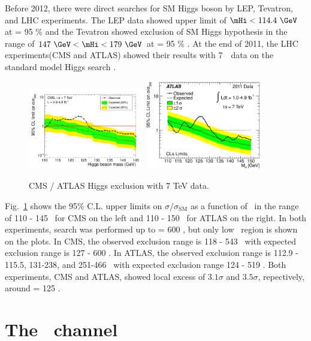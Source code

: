 Before 2012, there were direct searches for SM Higgs boson by LEP, Tevatron, 
and LHC experiments. 
The LEP data showed upper limit of $\mHi<114.4~\GeV$ at \CLs = 95 \% \cite{Beringer:1900zz} 
and the Tevatron showed exclusion of SM Higgs hypothesis in the range of 
$147~\GeV < \mHi < 179~\GeV$ at \CLs = 95 \% \cite{Beringer:1900zz}. 
At the end of 2011, the LHC experiments(CMS and ATLAS) showed their results with 7~\TeV\ data
on the standard model Higgs search \cite{Chatrchyan201226,Aad201249}. 
\begin{figure}[htp]
\centering
\includegraphics[width=0.45\textwidth]{figures/cls_comb_zoom.pdf}
\includegraphics[width=0.45\textwidth]{figures/fig_05b.eps}
\caption{ CMS / ATLAS Higgs exclusion with 7 TeV data. }
\label{fig:2011HiggsExp}
\end{figure}
Fig.~\ref{fig:2011HiggsExp} shows the 95\% C.L. upper limits on $\sigma/\sigma_{\textrm{SM}}$
as a function of \mHi\ in the range of 110 - 145 \GeV\ for CMS on the left and 
110 - 150 \GeV\ for ATLAS on the right. In both experiments, search was performed up to 
\mHi = 600 \GeV, but only low \mHi\ region is shown on the plots. 
In CMS, the observed exclusion range is 118 - 543 \GeV\ 
with expected exclusion range is 127 - 600 \GeV.     
In ATLAS, the observed exclusion range is 112.9 - 115.5, 131-238, and 251-466 \GeV\ 
with expected exclusion range 124 - 519 \GeV.  
Both experiments, CMS and ATLAS, showed local excess of 
$3.1\sigma$ and $3.5\sigma$, repectively, around \mHi = 125 \GeV. 

 

\newpage
\section{The \hww\ channel} 

